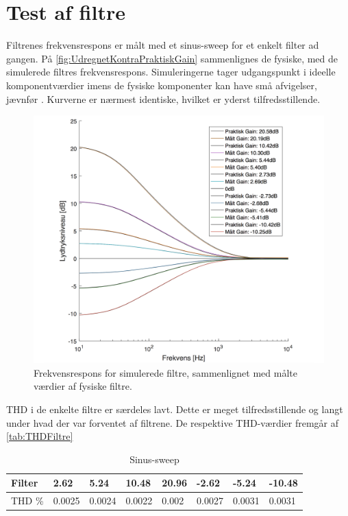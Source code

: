 \section{Test af filtre}
Filtrenes frekvensrespons er målt med et sinus-sweep for et enkelt filter ad gangen. På \autoref{fig:UdregnetKontraPraktiskGain} sammenlignes de fysiske, med de simulerede filtres frekvensrespons. Simuleringerne tager udgangspunkt i ideelle komponentværdier imens de fysiske komponenter kan have små afvigelser, jævnfør . Kurverne er nærmest identiske, hvilket er yderst tilfredsstillende.
%
\begin{figure}[H]
	\centering
	\includegraphics[resolution=300,width=\textwidth]{Figure/DesignAfFilter/PraktiskKontraSweepsSHORT.pdf}
	\caption{Frekvensrespons for simulerede filtre, sammenlignet med målte værdier af fysiske filtre.}
	\label{fig:UdregnetKontraPraktiskGain}
\end{figure}
\noindent
%
THD i de enkelte filtre er særdeles lavt. Dette er meget tilfredsstillende og langt under hvad der var forventet af filtrene. De respektive THD-værdier fremgår af \autoref{tab:THDFiltre}
%
\begin{table}[H]
\centering
\begin{tabular}{|l|l|l|l|l|l|l|l|}
\hline
Filter & 2.62 & 5.24 & 10.48 & 20.96 & -2.62 & -5.24 & -10.48 \\ \hline
THD \% & 0.0025 & 0.0024 & 0.0022 & 0.002 & 0.0027 & 0.0031 & 0.0031 \\ \hline
\end{tabular}
\caption{Sinus-sweep}
\label{tab:THDFiltre}
\end{table}

